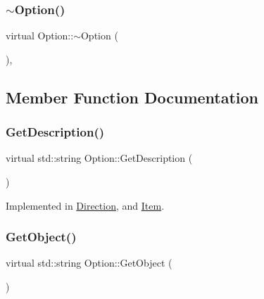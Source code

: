 \mbox{\label{class_option_a51319077627d44640d65010abc14b3c9}} 
\subsubsection{\texorpdfstring{$\sim$\+Option()}{~Option()}}
{\footnotesize\ttfamily virtual Option\+::$\sim$\+Option (\begin{DoxyParamCaption}{ }\end{DoxyParamCaption})\hspace{0.3cm}{\ttfamily [inline]}, {\ttfamily [virtual]}}



\subsection{Member Function Documentation}
\mbox{\label{class_option_a5e931f580c01238769c5de228666d0a5}} 
\subsubsection{\texorpdfstring{Get\+Description()}{GetDescription()}}
{\footnotesize\ttfamily virtual std\+::string Option\+::\+Get\+Description (\begin{DoxyParamCaption}{ }\end{DoxyParamCaption})\hspace{0.3cm}{\ttfamily [pure virtual]}}



Implemented in \mbox{\hyperlink{class_direction_a4cc685fd6eb1cae755be2d93fab59e30}{Direction}}, and \mbox{\hyperlink{class_item_a1d6f84eec4fee86d5d6c4be99152c86c}{Item}}.

\mbox{\label{class_option_ae87cbc4730a9b60734babe6b253fac0b}} 
\subsubsection{\texorpdfstring{Get\+Object()}{GetObject()}}
{\footnotesize\ttfamily virtual std\+::string Option\+::\+Get\+Object (\begin{DoxyParamCaption}{ }\end{DoxyParamCaption})\hspace{0.3cm}{\ttfamily [pure virtual]}}



